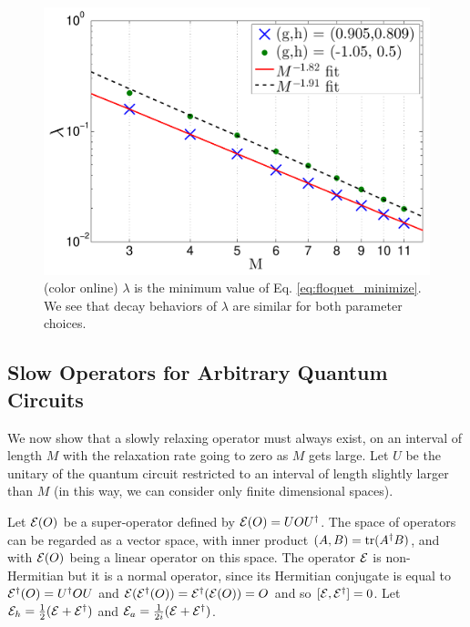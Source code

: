 \documentclass[twocolumn,superscriptaddress, prb]{revtex4-1}
\begin{document}
\begin{figure}
\includegraphics[width=1.0\linewidth]{semi_infinite_floquet_two_parameters_extended.pdf}
\centering
\caption{(color online) $\lambda$ is the minimum value of Eq. \eqref{eq:floquet_minimize}. We see that decay behaviors of $\lambda$ are similar for both parameter choices. }
\label{fig:floquet_two_parameters}
\end{figure}

\subsection{Slow Operators for Arbitrary Quantum Circuits}
We now show that a slowly relaxing operator must always exist, on an interval of length $M$ with the relaxation rate going to zero as $M$ gets large.  Let $U$ be the unitary of the quantum circuit restricted to an interval of length slightly larger than $M$ (in this way, we can consider only finite dimensional spaces).

Let ${\cal E}(O)$ be a super-operator defined by ${\cal E}(O)=UOU^\dagger$.  The space of operators can be regarded as a vector space, with inner product $(A,B)={\rm tr}(A^\dagger B)$, and with ${\cal E}(O)$ being a linear operator on this space.  The operator ${\cal E}$ is non-Hermitian but it is a normal operator, since its Hermitian conjugate is equal to ${\cal E}^\dagger(O)=U^\dagger O U$ and ${\cal E}({\cal E}^\dagger(O))={\cal E}^\dagger({\cal E}(O))=O$ and so $[{\cal E},{\cal E}^\dagger]=0$.
Let ${\cal E}_h=\frac{1}{2}({\cal E}+{\cal E}^\dagger)$ and ${\cal E}_a=\frac{1}{2i}({\cal E}+{\cal E}^\dagger)$.
\end{document}

